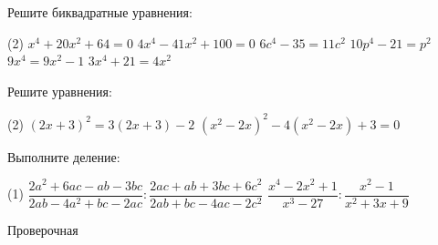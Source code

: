 \begin{class}[number=4]
	\begin{listofex}
		\item Решите биквадратные уравнения:
		\begin{tasks}(2)
			\task \( x^4+20x^2+64=0 \)
			\task \( 4x^4-41x^2+100=0 \)
			\task \( 6c^4-35=11c^2 \)
			\task \( 10p^4-21=p^2 \)
			\task \( 9x^4=9x^2-1 \)
			\task \( 3x^4+21=4x^2 \)
		\end{tasks}
		\item Решите уравнения:
		\begin{tasks}(2)
			\task \( (2x+3)^2=3(2x+3)-2 \)
			\task \( (x^2-2x)^2-4(x^2-2x)+3=0 \)
		\end{tasks}
		\item Выполните деление:
		\begin{tasks}(1)
			\task \( \dfrac{2a^2+6ac-ab-3bc}{2ab-4a^2+bc-2ac}:\dfrac{2ac+ab+3bc+6c^2}{2ab+bc-4ac-2c^2} \)
			\task \( \dfrac{x^4-2x^2+1}{x^3-27}:\dfrac{x^2-1}{x^2+3x+9} \)
		\end{tasks}
	\end{listofex}
\end{class}


\begin{exam}
	\begin{listofex}
		\item Проверочная
	\end{listofex}
\end{exam}
